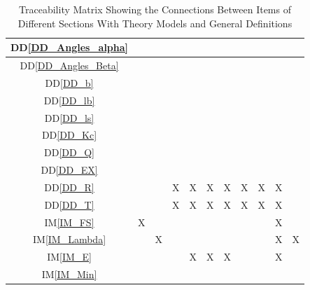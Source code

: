 \documentclass[12pt]{article}
\newcommand{\iref}[1]{IM\ref{#1}}
\newcommand{\ddref}[1]{DD\ref{#1}}
\begin{document}
{\begin{landscape}
\begin{table}[h!]
\begin{tabular}{|c|c|c|c|c|c|c|c|c|c|c|}
\ddref{DD_Angles_alpha} & & & & & & & & & & \\ \hline
\ddref{DD_Angles_Beta}  & & & & & & & & & & \\ \hline
\ddref{DD_b}            & & & & & & & & & & \\ \hline
\ddref{DD_lb}           & & & & & & & & & & \\ \hline
\ddref{DD_ls}           & & & & & & & & & & \\ \hline
\ddref{DD_Kc}           & & & & & & & & & & \\ \hline
\ddref{DD_Q}            & & & & & & & & & & \\ \hline
\ddref{DD_EX}           & & & & & & & & & & \\ \hline
\ddref{DD_R}            & & & X& X& X& X& X& X& X& \\ \hline
\ddref{DD_T}            & & & X& X& X& X& X& X& X& \\ \hline
\iref{IM_FS}            & X& & & & & & & & X& \\ \hline
\iref{IM_Lambda}        & & X& & & & & & & X& X\\ \hline
\iref{IM_E}             & & & & X& X& X& & & X& \\ \hline
\iref{IM_Min}           & & & & & & & & & & \\
\hline
\end{tabular}
\caption{Traceability Matrix Showing the Connections Between Items of Different 
Sections With Theory Models and General Definitions}
\label{Table:trace}
\end{table}
\end{landscape}
}
\end{document}
